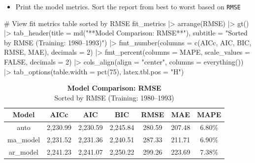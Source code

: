 \documentclass[
  letterpaper,
  DIV=11,
  numbers=noendperiod]{scrartcl}
\newenvironment{Shaded}{\begin{snugshade}}{\end{snugshade}}
\newcommand{\AttributeTok}[1]{\textcolor[rgb]{0.40,0.45,0.13}{#1}}
\newcommand{\CommentTok}[1]{\textcolor[rgb]{0.37,0.37,0.37}{#1}}
\newcommand{\ConstantTok}[1]{\textcolor[rgb]{0.56,0.35,0.01}{#1}}
\newcommand{\DecValTok}[1]{\textcolor[rgb]{0.68,0.00,0.00}{#1}}
\newcommand{\FunctionTok}[1]{\textcolor[rgb]{0.28,0.35,0.67}{#1}}
\newcommand{\NormalTok}[1]{\textcolor[rgb]{0.00,0.23,0.31}{#1}}
\newcommand{\SpecialCharTok}[1]{\textcolor[rgb]{0.37,0.37,0.37}{#1}}
\newcommand{\StringTok}[1]{\textcolor[rgb]{0.13,0.47,0.30}{#1}}
\providecommand{\tightlist}{%
  \setlength{\itemsep}{0pt}\setlength{\parskip}{0pt}}
\begin{document}
\begin{itemize}
\tightlist
\item
  Print the model metrics. Sort the report from best to worst based on
  \texttt{RMSE}
\end{itemize}

\begin{Shaded}
\begin{Highlighting}[]
\CommentTok{\# View fit metrics table sorted by RMSE}
\NormalTok{fit\_metrics }\SpecialCharTok{|\textgreater{}} \FunctionTok{arrange}\NormalTok{(RMSE) }\SpecialCharTok{|\textgreater{}} \FunctionTok{gt}\NormalTok{() }\SpecialCharTok{|\textgreater{}}
  \FunctionTok{tab\_header}\NormalTok{(}\AttributeTok{title =} \FunctionTok{md}\NormalTok{(}\StringTok{"**Model Comparison: RMSE**"}\NormalTok{),}
             \AttributeTok{subtitle =} \StringTok{"Sorted by RMSE (Training: 1980–1993)"}\NormalTok{) }\SpecialCharTok{|\textgreater{}}
  \FunctionTok{fmt\_number}\NormalTok{(}\AttributeTok{columns =} \FunctionTok{c}\NormalTok{(AICc, AIC, BIC, RMSE, MAE), }\AttributeTok{decimals =} \DecValTok{2}\NormalTok{) }\SpecialCharTok{|\textgreater{}}
  \FunctionTok{fmt\_percent}\NormalTok{(}\AttributeTok{columns =}\NormalTok{ MAPE, }\AttributeTok{scale\_values =} \ConstantTok{FALSE}\NormalTok{, }\AttributeTok{decimals =} \DecValTok{2}\NormalTok{) }\SpecialCharTok{|\textgreater{}}
  \FunctionTok{cols\_align}\NormalTok{(}\AttributeTok{align =} \StringTok{"center"}\NormalTok{, }\AttributeTok{columns =} \FunctionTok{everything}\NormalTok{()) }\SpecialCharTok{|\textgreater{}}
  \FunctionTok{tab\_options}\NormalTok{(}\AttributeTok{table.width =} \FunctionTok{pct}\NormalTok{(}\DecValTok{75}\NormalTok{), }\AttributeTok{latex.tbl.pos =} \StringTok{"H"}\NormalTok{)}
\end{Highlighting}
\end{Shaded}

\begin{table}
\caption*{
{\fontsize{20}{25}\selectfont  \textbf{Model Comparison: RMSE}\fontsize{12}{15}\selectfont } \\ 
{\fontsize{14}{17}\selectfont  Sorted by RMSE (Training: 1980–1993)\fontsize{12}{15}\selectfont }
} 
\fontsize{12.0pt}{14.0pt}\selectfont
\begin{tabular*}{0.75\linewidth}{@{\extracolsep{\fill}}ccccccc}
\toprule
Model & AICc & AIC & BIC & RMSE & MAE & MAPE \\ 
\midrule\addlinespace[2.5pt]
auto & 2,230.99 & 2,230.59 & 2,245.84 & 280.59 & 207.48 & 6.80\% \\ 
ma\_model & 2,231.52 & 2,231.36 & 2,240.51 & 287.33 & 211.71 & 6.90\% \\ 
ar\_model & 2,241.23 & 2,241.07 & 2,250.22 & 299.26 & 223.69 & 7.38\% \\ 
\bottomrule
\end{tabular*}
\end{table}
\end{document}
